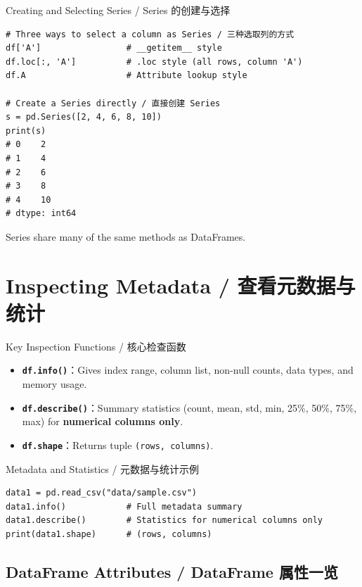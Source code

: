 \documentclass[11pt,a4paper]{article}
\begin{document}
\begin{examplebox}{Creating and Selecting Series / Series 的创建与选择}
\begin{lstlisting}
# Three ways to select a column as Series / 三种选取列的方式
df['A']                 # __getitem__ style
df.loc[:, 'A']          # .loc style (all rows, column 'A')
df.A                    # Attribute lookup style

# Create a Series directly / 直接创建 Series
s = pd.Series([2, 4, 6, 8, 10])
print(s)
# 0    2
# 1    4
# 2    6
# 3    8
# 4    10
# dtype: int64
\end{lstlisting}
    Series share many of the same methods as DataFrames.
\end{examplebox}

\section{Inspecting Metadata / 查看元数据与统计}

\begin{concept}{Key Inspection Functions / 核心检查函数}
    \begin{itemize}[itemsep=0.8em]
        \item \textbf{\texttt{df.info()}}：Gives index range, column list, non-null counts, data types, and memory usage.
        \item \textbf{\texttt{df.describe()}}：Summary statistics (count, mean, std, min, 25\%, 50\%, 75\%, max) for \textbf{numerical columns only}.
        \item \textbf{\texttt{df.shape}}：Returns tuple \texttt{(rows, columns)}.
    \end{itemize}
\end{concept}

\begin{examplebox}{Metadata and Statistics / 元数据与统计示例}
\begin{lstlisting}
data1 = pd.read_csv("data/sample.csv")
data1.info()            # Full metadata summary
data1.describe()        # Statistics for numerical columns only
print(data1.shape)      # (rows, columns)
\end{lstlisting}
\end{examplebox}

\subsection{DataFrame Attributes / DataFrame 属性一览}
\end{document}
